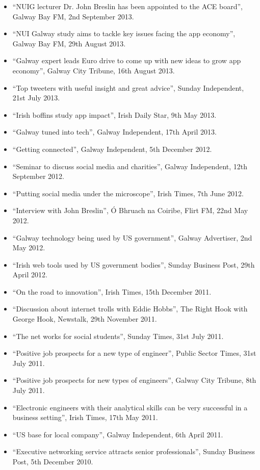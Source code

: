 \documentclass[10pt,a4paper]{res} %
\begin{document}
\begin{resume}
{\begin{itemize}
\item ``NUIG lecturer Dr. John Breslin has been appointed to the ACE board'', Galway Bay FM, 2nd September 2013.
\item ``NUI Galway study aims to tackle key issues facing the app economy'', Galway Bay FM, 29th August 2013.
\item ``Galway expert leads Euro drive to come up with new ideas to grow app economy'', Galway City Tribune, 16th August 2013.
\item ``Top tweeters with useful insight and great advice'', Sunday Independent, 21st July 2013.
\item ``Irish boffins study app impact'', Irish Daily Star, 9th May 2013.
\item ``Galway tuned into tech'', Galway Independent, 17th April 2013.
\item ``Getting connected'', Galway Independent, 5th December 2012.
\item ``Seminar to discuss social media and charities'', Galway Independent, 12th September 2012.
\item ``Putting social media under the microscope'', Irish Times, 7th June 2012.
\item ``Interview with John Breslin'', \'{O} Bhruach na Coiribe, Flirt FM, 22nd May 2012.
\item ``Galway technology being used by US government'', Galway Advertiser, 2nd May 2012.
\item ``Irish web tools used by US government bodies'', Sunday Business Post, 29th April 2012.
\item ``On the road to innovation'', Irish Times, 15th December 2011.
\item ``Discussion about internet trolls with Eddie Hobbs'', The Right Hook with George Hook, Newstalk, 29th November 2011.
\item ``The net works for social students'', Sunday Times, 31st July 2011.
\item ``Positive job prospects for a new type of engineer'', Public Sector Times, 31st July 2011.
\item ``Positive job prospects for new types of engineers'', Galway City Tribune, 8th July 2011.
\item ``Electronic engineers with their analytical skills can be very successful in a business setting'', Irish Times, 17th May 2011.
\item ``US base for local company'', Galway Independent, 6th April 2011.
\item ``Executive networking service attracts senior professionals'', Sunday Business Post, 5th December 2010.

\end{itemize}}
\end{resume}
\end{document}
